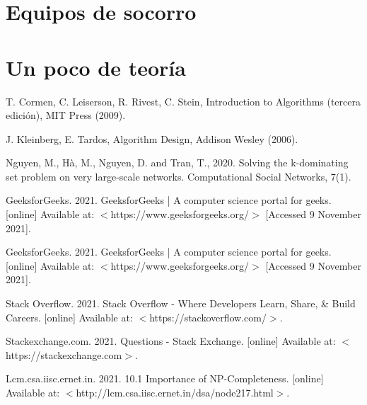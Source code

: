 \documentclass[hidelinks]{report}
\begin{document}
\chapter{Equipos de socorro}

\clearpage

\chapter{Un poco de teoría}

\clearpage

\begin{thebibliography}{9}
T. Cormen, C. Leiserson, R. Rivest, C. Stein, Introduction to Algorithms (tercera edición), MIT Press (2009).

J. Kleinberg, E. Tardos, Algorithm Design, Addison Wesley (2006).

Nguyen, M., Hà, M., Nguyen, D. and Tran, T., 2020. Solving the k-dominating set problem on very large-scale networks. Computational Social Networks, 7(1).

GeeksforGeeks. 2021. GeeksforGeeks | A computer science portal for geeks. [online] Available at: $<$https://www.geeksforgeeks.org/$>$ [Accessed 9 November 2021].

GeeksforGeeks. 2021. GeeksforGeeks | A computer science portal for geeks. [online] Available at: $<$https://www.geeksforgeeks.org/$>$ [Accessed 9 November 2021].

Stack Overflow. 2021. Stack Overflow - Where Developers Learn, Share, & Build Careers. [online] Available at: $<$https://stackoverflow.com/$>$.

Stackexchange.com. 2021. Questions - Stack Exchange. [online] Available at: $<$https://stackexchange.com$>$.


Lcm.csa.iisc.ernet.in. 2021. 10.1 Importance of NP-Completeness. [online] Available at: $<$http://lcm.csa.iisc.ernet.in/dsa/node217.html$>$.
\end{thebibliography}
\end{document}
